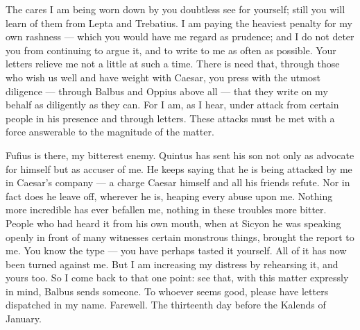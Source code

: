 

 The cares I am being worn down by you doubtless see for yourself; still you will learn of them from Lepta and Trebatius. I am paying the heaviest penalty for my own rashness --- which you would have me regard as prudence; and I do not deter you from continuing to argue it, and to write to me as often as possible. Your letters relieve me not a little at such a time. There is need that, through those who wish us well and have weight with Caesar, you press with the utmost diligence --- through Balbus and Oppius above all --- that they write on my behalf as diligently as they can. For I am, as I hear, under attack from certain people in his presence and through letters. These attacks must be met with a force answerable to the magnitude of the matter.

 Fufius is there, my bitterest enemy. Quintus has sent his son not only as advocate for himself but as accuser of me. He keeps saying that he is being attacked by me in Caesar's company --- a charge Caesar himself and all his friends refute. Nor in fact does he leave off, wherever he is, heaping every abuse upon me. Nothing more incredible has ever befallen me, nothing in these troubles more bitter. People who had heard it from his own mouth, when at Sicyon he was speaking openly in front of many witnesses certain monstrous things, brought the report to me. You know the type --- you have perhaps tasted it yourself. All of it has now been turned against me. But I am increasing my distress by rehearsing it, and yours too. So I come back to that one point: see that, with this matter expressly in mind, Balbus sends someone. To whoever seems good, please have letters dispatched in my name. Farewell. The thirteenth day before the Kalends of January.

